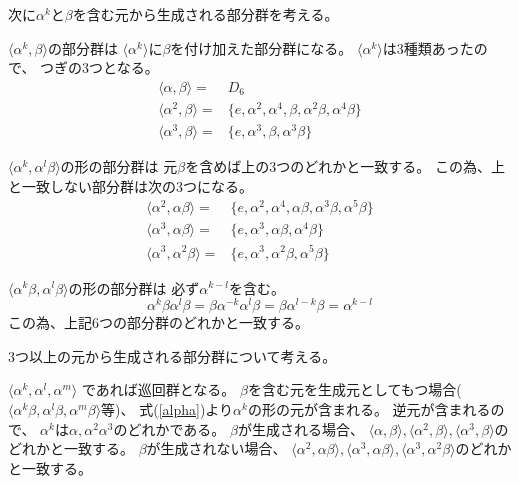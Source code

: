 \documentclass[12pt,b5paper]{ltjsarticle}
\begin{document}
次に$\alpha^k$と$\beta$を含む元から生成される部分群を考える。

$\langle \alpha^k,\beta \rangle$の部分群は
$\langle \alpha^k \rangle$に$\beta$を付け加えた部分群になる。
$\langle \alpha^k \rangle$は3種類あったので、
つぎの3つとなる。
\begin{align}
 \langle \alpha,\beta \rangle =& D_{6}\\
 \langle \alpha^2,\beta \rangle =& \{e, \alpha^2, \alpha^4, \beta, \alpha^2\beta, \alpha^4\beta \}\\
 \langle \alpha^3,\beta \rangle =& \{e, \alpha^3, \beta, \alpha^3\beta \}
\end{align}


$\langle \alpha^k,\alpha^l\beta \rangle$の形の部分群は
元$\beta$を含めば上の3つのどれかと一致する。
この為、上と一致しない部分群は次の3つになる。
\begin{align}
 \langle \alpha^2,\alpha\beta \rangle =& \{e, \alpha^2, \alpha^4, \alpha\beta, \alpha^3\beta, \alpha^5\beta \}\\
 \langle \alpha^3,\alpha\beta \rangle =& \{e, \alpha^3, \alpha\beta, \alpha^4\beta \}\\
 \langle \alpha^3,\alpha^2\beta \rangle =& \{e, \alpha^3, \alpha^2\beta, \alpha^5\beta \}
\end{align}


$\langle \alpha^k\beta, \alpha^l\beta \rangle$の形の部分群は
必ず$\alpha^{k-l}$を含む。
\begin{equation}
  \alpha^k\beta \alpha^l\beta
  = \beta\alpha^{-k} \alpha^l\beta
  = \beta \alpha^{l-k}\beta
  = \alpha^{k-l}
  \label{alpha}
\end{equation}
この為、上記6つの部分群のどれかと一致する。


3つ以上の元から生成される部分群について考える。

$\langle \alpha^k,\alpha^l,\alpha^m \rangle$
であれば巡回群となる。
$\beta$を含む元を生成元としてもつ場合($\langle \alpha^k\beta,\alpha^l\beta,\alpha^m\beta \rangle$等)、
式(\ref{alpha})より$\alpha^k$の形の元が含まれる。
逆元が含まれるので、
$\alpha^k$は$\alpha,\alpha^2\alpha^3$のどれかである。
$\beta$が生成される場合、
$\langle \alpha,\beta \rangle, \langle \alpha^2,\beta \rangle, \langle \alpha^3,\beta \rangle$のどれかと一致する。
$\beta$が生成されない場合、
$\langle \alpha^2,\alpha\beta \rangle, \langle \alpha^3,\alpha\beta \rangle, \langle \alpha^3,\alpha^2\beta \rangle$のどれかと一致する。
\end{document}
